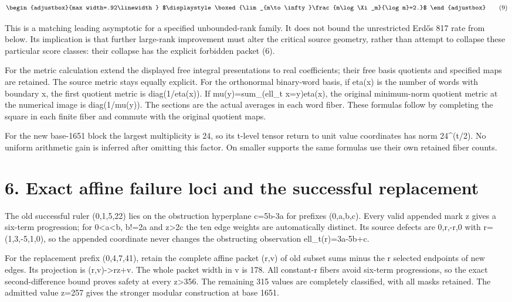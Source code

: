 \[
\begin{adjustbox}{max width=.92\linewidth}
$\displaystyle \boxed{\lim_{m\to\infty}\frac{m\log\Xi_m}{\log m}=2.}$
\end{adjustbox}
\tag{9}
\]

This is a matching leading asymptotic for a specified unbounded-rank family. It does not bound the unrestricted Erdős 817 rate from below. Its implication is that further large-rank improvement must alter the critical source geometry, rather than attempt to collapse these particular score classes: their collapse has the explicit forbidden packet (6).

For the metric calculation extend the displayed free integral presentations to real coefficients; their free basis quotients and specified maps are retained. The source metric stays equally explicit. For the orthonormal binary-word basis, if eta(x) is the number of words with boundary x, the first quotient metric is diag(1/eta(x)). If mu(y)=sum\_(ell\_t x=y)eta(x), the original minimum-norm quotient metric at the numerical image is diag(1/mu(y)). The sections are the actual averages in each word fiber. These formulas follow by completing the square in each finite fiber and commute with the original quotient maps.

For the new base-1651 block the largest multiplicity is 24, so its t-level tensor return to unit value coordinates has norm 24\^{}(t/2). No uniform arithmetic gain is inferred after omitting this factor. On smaller supports the same formulas use their own retained fiber counts.

\section{6. Exact affine failure loci and the successful replacement}\label{n10-exact-affine-failure-loci-and-the-successful-replacement}

The old successful ruler (0,1,5,22) lies on the obstruction hyperplane c=5b-3a for prefixes (0,a,b,c). Every valid appended mark z gives a six-term progression; for 0\textless a\textless b, b!=2a and z\textgreater2c the ten edge weights are automatically distinct. Its source defects are 0,r,-r,0 with r=(1,3,-5,1,0), so the appended coordinate never changes the obstructing observation ell\_t(r)=3a-5b+c.

For the replacement prefix (0,4,7,41), retain the complete affine packet (r,v) of old subset sums minus the r selected endpoints of new edges. Its projection is (r,v)-\textgreater rz+v. The whole packet width in v is 178. All constant-r fibers avoid six-term progressions, so the exact second-difference bound proves safety at every z\textgreater356. The remaining 315 values are completely classified, with all masks retained. The admitted value z=257 gives the stronger modular construction at base 1651.

